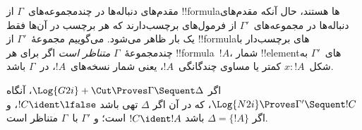 \documentclass[../../../include/open-logic-section]{subfiles}
\begin{document}


مقدم‌های دنباله‌ها در  چندمجموعه‌های~$\Gamma$ از
!!{formula}ها هستند، حال آنکه مقدم‌های دنباله‌ها در 
مجموعه‌های~$\Gamma'$ از فرمول‌های برچسب‌دارند که هر برچسب در آن‌ها فقط
یک بار ظاهر می‌شود. می‌گوییم مجموعهٔ~$\Gamma'$ از !!{formula}های
برچسب‌دار با چندمجموعهٔ~$\Gamma$ \emph{متناظر است} اگر برای هر
!!{formula}~$!A$، شمار !!{element}های~$\Gamma'$ به شکل~$x:!A$ کمتر یا
مساوی چندگانگی~$!A$، یعنی شمار نسخه‌های~$!A$، در~$\Gamma$ باشد.

\begin{prop}
اگر $\Log{G2i}+\Cut\Proves\Gamma\Sequent\Delta$، آنگاه
$\Log{N2i}\Proves\Gamma'\Sequent !C$، که در آن اگر $\Delta$ تهی باشد
$!C\ident\lfalse$، و اگر $\Delta=\{!A\}$ باشد $!C\ident !A$ است؛ و
$\Gamma'$ با~$\Gamma$ متناظر است.
\end{prop}
\end{document}
